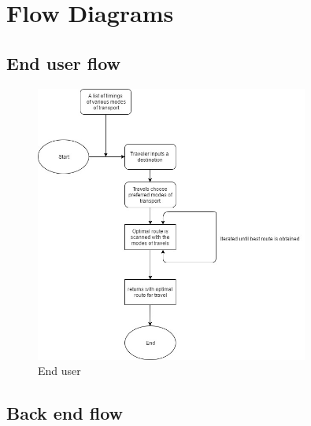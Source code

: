 \documentclass[12pt,a4paper]{article}
\begin{document}
\section{Flow Diagrams}

\subsection{End user flow}
\begin{figure}[!hp]
    \centering
    \includegraphics[width=0.8\textwidth]{flowcharts/basicflow.jpg}
    \caption{End user}
    \label{fig:Enduser flow}
\end{figure}
\subsection{Back end flow}
\end{document}
